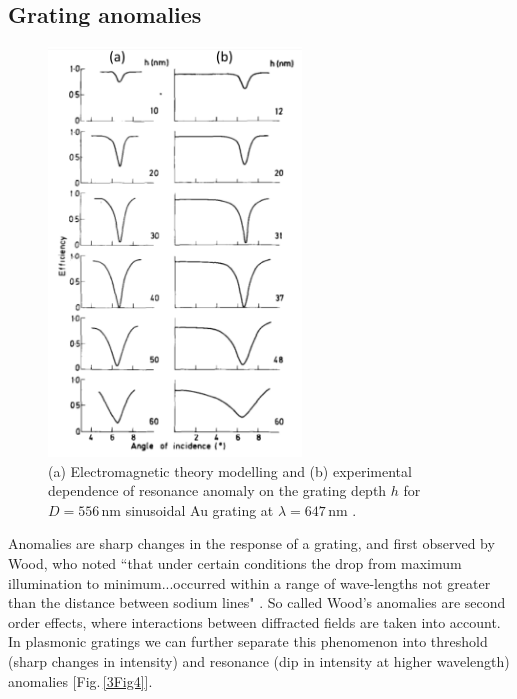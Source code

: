 \subsection{Grating anomalies}
\begin{figure}[h!] 
\centering    
\includegraphics[width=0.6\textwidth]{Fig5}
\caption{(a) Electromagnetic theory modelling and (b) experimental dependence of resonance anomaly on the grating depth $h$ for $D=556$\,nm sinusoidal Au grating at $\lambda=647$\,nm \cite{Hutley1976}. }
\label{3Fig5}
\end{figure}

Anomalies are sharp changes in the response of a grating, and first observed by Wood, who noted ``that under certain conditions the drop from maximum illumination to minimum...occurred within a range of wave-lengths not greater than the distance between sodium lines" \cite{Wood1902}. So called Wood's anomalies are second order effects, where interactions between diffracted fields are taken into account. In plasmonic gratings we can further separate this phenomenon into threshold (sharp changes in intensity) and resonance (dip in intensity at higher wavelength) anomalies [Fig.\,\ref{3Fig4}].

